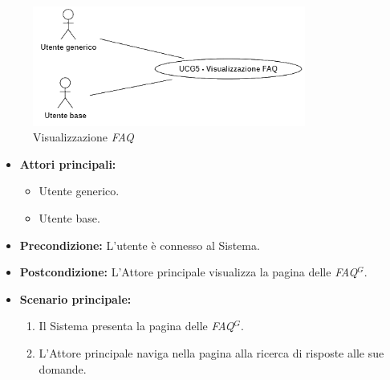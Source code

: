 \newpage
{}

\label{usecase:Visualizzazione FAQ}

\begin{figure}[h]
	\centering
	\includegraphics[width=0.8\textwidth]{./uml/UCG5.png} 
	\caption{Visualizzazione \textit{FAQ}}
	\label{fig:UCG5}
  \end{figure}

\begin{itemize}
	\item \textbf{Attori principali:} 
	\begin{itemize}
		\item Utente generico.
		\item Utente base.
	\end{itemize}


	\item \textbf{Precondizione:}
	      L'utente è connesso al Sistema.

	\item \textbf{Postcondizione:} L'Attore principale visualizza la pagina delle \textit{\ac{FAQ}$^G$}.

	\item \textbf{Scenario principale:}
	      \begin{enumerate}
              \item Il Sistema presenta la pagina delle \textit{\ac{FAQ}$^G$}.
              \item L'Attore principale naviga nella pagina alla ricerca di risposte alle sue domande.
		    
	      \end{enumerate}
\end{itemize}